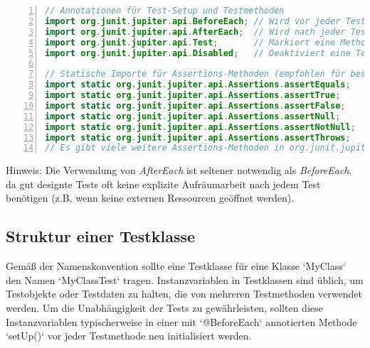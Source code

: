 \begin{lstlisting}[language=Java, caption={Grundlegende JUnit 5 Importe}, label=lst:junit_imports, basicstyle=\ttfamily\footnotesize, breaklines=true, frame=tb, numbers=left]
// Annotationen für Test-Setup und Testmethoden
import org.junit.jupiter.api.BeforeEach; // Wird vor jeder Testmethode ausgeführt
import org.junit.jupiter.api.AfterEach;  // Wird nach jeder Testmethode ausgeführt (seltener benötigt)
import org.junit.jupiter.api.Test;       // Markiert eine Methode als Testmethode
import org.junit.jupiter.api.Disabled;   // Deaktiviert eine Testmethode oder -klasse

// Statische Importe für Assertions-Methoden (empfohlen für bessere Lesbarkeit)
import static org.junit.jupiter.api.Assertions.assertEquals;
import static org.junit.jupiter.api.Assertions.assertTrue;
import static org.junit.jupiter.api.Assertions.assertFalse;
import static org.junit.jupiter.api.Assertions.assertNull;
import static org.junit.jupiter.api.Assertions.assertNotNull;
import static org.junit.jupiter.api.Assertions.assertThrows;
// Es gibt viele weitere Assertions-Methoden in org.junit.jupiter.api.Assertions
\end{lstlisting}
Hinweis: Die Verwendung von \textit{AfterEach} ist seltener notwendig als \textit{BeforeEach}, da gut designte Tests oft keine explizite Aufräumarbeit nach jedem Test benötigen (z.B. wenn keine externen Ressourcen geöffnet werden).

\subsection{Struktur einer Testklasse}
\label{ssec:junit_klassenkopf}
Gemäß der Namenskonvention sollte eine Testklasse für eine Klasse `MyClass` den Namen `MyClassTest` tragen. Instanzvariablen in Testklassen sind üblich, um Testobjekte oder Testdaten zu halten, die von mehreren Testmethoden verwendet werden. Um die Unabhängigkeit der Tests zu gewährleisten, sollten diese Instanzvariablen typischerweise in einer mit `@BeforeEach` annotierten Methode `setUp()` vor jeder Testmethode neu initialisiert werden.

